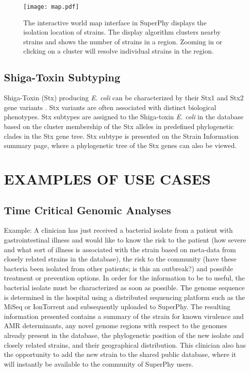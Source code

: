 \documentclass[a4paper,twoside]{article}
\begin{document}
\begin{figure}[t]
  \centering
   {\texttt{[image: map.pdf]}}
   \vspace{0.2cm}
  \caption{The interactive world map interface in SuperPhy displays the isolation location of strains. The display algorithm clusters nearby strains and shows the number of strains in a region. Zooming in or clicking on a cluster will resolve individual strains in the region.}
  \label{fig:map}
\end{figure}


\subsection{Shiga-Toxin Subtyping}

Shiga-Toxin (Stx) producing \textit{E. coli} can be characterized by their Stx1 and Stx2 gene variants \cite{scheutz_multicenter_2012}. Stx variants are often associated with distinct biological phenotypes. Stx subtypes are assigned to the Shiga-toxin \textit{E. coli} in the database based on the cluster membership of the Stx alleles in predefined phylogenetic clades in the Stx gene tree. Stx subtype is presented on the Strain Information summary page, where a phylogenetic tree of the Stx genes can also be viewed.

\section{\uppercase{Examples of Use Cases}}
\label{sec:cases}
\subsection{Time Critical Genomic Analyses}
Example: A clinician has just received a bacterial isolate from a patient with gastrointestinal illness and would like to know the risk to the patient (how severe and what sort of illness is associated with the strain based on meta-data from closely related strains in the database), the risk to the community (have these bacteria been isolated from other patients; is this an outbreak?) and possible treatment or prevention options. In order for the information to be to useful, the bacterial isolate must be characterized as soon as possible. The genome sequence is determined in the hospital using a distributed sequencing platform such as the MiSeq or IonTorrent and subsequently uploaded to SuperPhy. The resulting information presented contains a summary of the strain for known virulence and AMR determinants, any novel genome regions with respect to the genomes already present in the database, the phylogenetic position of the new isolate and closely related strains, and their geographical distribution. This clinician also has the opportunity to add the new strain to the shared public database, where it will instantly be available to the community of SuperPhy users.
\end{document}
